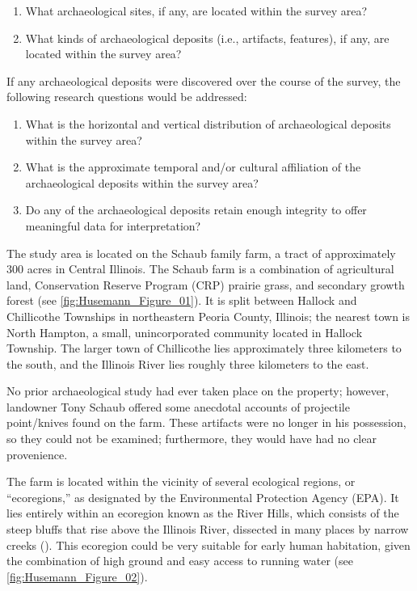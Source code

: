 \begin{enumerate}
	\item What archaeological sites, if any, are located within the survey area?
	\item What kinds of archaeological deposits (i.e., artifacts, features), if any, are located within the survey area?
\end{enumerate}

If any archaeological deposits were discovered over the course of the survey, the following research questions would be addressed:

\begin{enumerate}
	\item What is the horizontal and vertical distribution of archaeological deposits within the survey area?
	\item What is the approximate temporal and/or cultural affiliation of the archaeological deposits within the survey area?
	\item Do any of the archaeological deposits retain enough integrity to offer meaningful data for interpretation?
\end{enumerate}





The study area is located on the Schaub family farm, a tract of approximately 300 acres in Central Illinois. The Schaub farm is a combination of agricultural land, Conservation Reserve Program (CRP) prairie grass, and secondary growth forest (see \ref{fig:Husemann_Figure_01}). It is split between Hallock and Chillicothe Townships in northeastern Peoria County, Illinois; the nearest town is North Hampton, a small, unincorporated community located in Hallock Township. The larger town of Chillicothe lies approximately three kilometers to the south, and the Illinois River lies roughly three kilometers to the east.

No prior archaeological study had ever taken place on the property; however, landowner Tony Schaub offered some anecdotal accounts of projectile point/knives found on the farm. These artifacts were no longer in his possession, so they could not be examined; furthermore, they would have had no clear provenience.


The farm is located within the vicinity of several ecological regions, or “ecoregions,” as designated by the Environmental Protection Agency (EPA). It lies entirely within an ecoregion known as the River Hills, which consists of the steep bluffs that rise above the Illinois River, dissected in many places by narrow creeks (\cite{epa}). This ecoregion could be very suitable for early human habitation, given the combination of high ground and easy access to running water (see \cref{fig:Husemann_Figure_02}).

